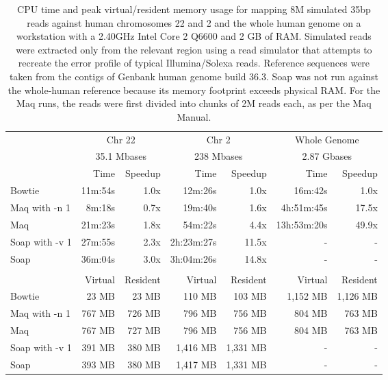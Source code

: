\documentclass[letterpaper]{article}
\begin{document}
\begin{table}[tp]
\scriptsize
\begin{tabular}{lrrrrrr}
\toprule
 & \multicolumn{2}{c}{Chr 22} & \multicolumn{2}{c}{Chr 2} & \multicolumn{2}{c}{Whole Genome} \\[3pt] 
 & \multicolumn{2}{c}{35.1 Mbases} & \multicolumn{2}{c}{238 Mbases} & \multicolumn{2}{c}{2.87 Gbases} \\[3pt] 
 & Time & Speedup & Time & Speedup & Time & Speedup \\ 
\toprule
Bowtie & 11m:54s & 1.0x & 12m:26s & 1.0x & 16m:42s & 1.0x  \\ \midrule 
Maq with -n 1 & 8m:18s & 0.7x & 19m:40s & 1.6x & 4h:51m:45s & 17.5x  \\ \midrule 
Maq & 21m:23s & 1.8x & 54m:22s & 4.4x & 13h:53m:20s & 49.9x  \\ \midrule 
Soap with -v 1 & 27m:55s & 2.3x & 2h:23m:27s & 11.5x & - & -  \\ \midrule 
Soap & 36m:04s & 3.0x & 3h:04m:26s & 14.8x & - & -  \\[2pt] \bottomrule \\ 
 & Virtual & Resident & Virtual & Resident & Virtual & Resident \\ 
\toprule
Bowtie & 23 MB & 23 MB & 110 MB & 103 MB & 1,152 MB & 1,126 MB  \\ \midrule 
Maq with -n 1 & 767 MB & 726 MB & 796 MB & 756 MB & 804 MB & 763 MB  \\ \midrule 
Maq & 767 MB & 727 MB & 796 MB & 756 MB & 804 MB & 763 MB  \\ \midrule 
Soap with -v 1 & 391 MB & 380 MB & 1,416 MB & 1,331 MB & - & -  \\ \midrule 
Soap & 393 MB & 380 MB & 1,417 MB & 1,331 MB & - & -  \\ 
\bottomrule
\end{tabular}
\scriptsize\caption{CPU time and peak virtual/resident memory usage for mapping 8M simulated 35bp reads against human chromosomes 22 and 2 and the whole human genome on a workstation with a 2.40GHz Intel Core 2 Q6600 and 2 GB of RAM. Simulated reads were extracted only from the relevant region using a read simulator that attempts to recreate the error profile of typical Illumina/Solexa reads. Reference sequences were taken from the contigs of Genbank human genome build 36.3. Soap was not run against the whole-human reference because its memory footprint exceeds physical RAM. For the Maq runs, the reads were first divided into chunks of 2M reads each, as per the Maq Manual.}
\end{table}
\end{document}
